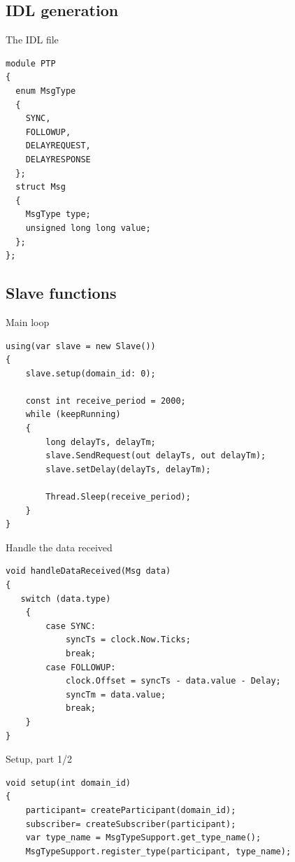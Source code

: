 \documentclass[compressed, presentation, notheorems, 12pt]{beamer}
\begin{document}
\subsection{IDL generation}
	\begin{frame}[containsverbatim]{The IDL file}

	\begin{lstlisting}[style=Code-C++]
module PTP
{
  enum MsgType
  {
    SYNC,
    FOLLOWUP,
    DELAYREQUEST,
    DELAYRESPONSE
  };
  struct Msg
  {
    MsgType type;         
    unsigned long long value;     
  };
};
	\end{lstlisting}
	\end{frame}



\subsection{Slave functions}

	\begin{frame}[containsverbatim]{Main loop}
	
	\begin{lstlisting}[style=Code-C++]
using(var slave = new Slave())
{
	slave.setup(domain_id: 0);
	
	const int receive_period = 2000; 
	while (keepRunning)
	{
		long delayTs, delayTm;
		slave.SendRequest(out delayTs, out delayTm);
		slave.setDelay(delayTs, delayTm);

		Thread.Sleep(receive_period);
	}
}
	\end{lstlisting}

	\end{frame}




	\begin{frame}[containsverbatim]{Handle the data received}
	\begin{lstlisting}[style=Code-C++]
void handleDataReceived(Msg data)
{
   switch (data.type)
	{
		case SYNC:
			syncTs = clock.Now.Ticks;
			break;
		case FOLLOWUP:
			clock.Offset = syncTs - data.value - Delay;
			syncTm = data.value;
			break;
	}
}
	\end{lstlisting}
	\end{frame}




	\begin{frame}[containsverbatim]{Setup, part 1/2}
	\begin{lstlisting}[style=Code-C++]
void setup(int domain_id)
{
	participant= createParticipant(domain_id);
	subscriber= createSubscriber(participant);		
	var type_name = MsgTypeSupport.get_type_name();
	MsgTypeSupport.register_type(participant, type_name);

	\end{lstlisting}
	\end{frame}
\end{document}
